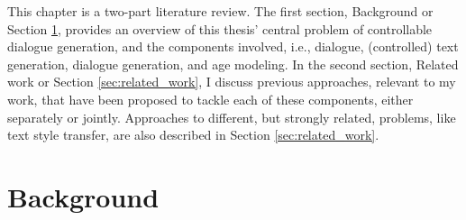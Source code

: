 
This chapter is a two-part literature review. The first section, Background or Section \ref{sec:background}, provides an overview of this thesis' central problem of controllable dialogue generation, and the components involved, i.e., dialogue, (controlled) text generation, dialogue generation, and age modeling. In the second section, Related work or Section \ref{sec:related_work}, I discuss previous approaches, relevant to my work, that have been proposed to tackle each of these components, either separately or jointly. Approaches to different, but strongly related, problems, like text style transfer, are also described in Section \ref{sec:related_work}.

\section{Background}
\label{sec:background}



